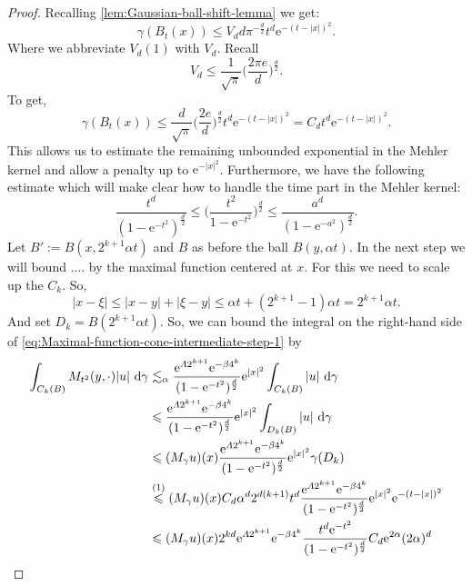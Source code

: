 \documentclass[a4paper,oneside,10pt]{amsproc}
\theoremstyle{remark}
\newcommand{\D}{\,\textup{d}}
\renewcommand{\leq}{\leqslant}
\renewcommand{\leq}{\leqslant}
\newcommand{\e}{\mathrm{e}} %
\renewcommand{\leq}{\leqslant}%
\begin{document}
\begin{proof}
  Recalling \autoref{lem:Gaussian-ball-shift-lemma} we get:
  \begin{equation}
    \label{eq:Gaussian-ball-Maximal-function-cone-proof-1}
    \gamma(B_t(x)) \leq V_d d \pi^{-\frac{d}2} t^d \e^{-(t - |x|)^2} .
  \end{equation}
  Where we abbreviate $V_d(1)$ with $V_d$.
  Recall
  \begin{equation*}
    V_d \leq \frac1{\sqrt{\pi}} \biggl(\frac{2\pi e}{d}
    \biggr)^{\frac{d}{2}}.
  \end{equation*}
  To get,
  \begin{equation}
    \label{eq:Gaussian-ball-Maximal-function-cone-proof-2}
    \gamma(B_t(x)) \leq \frac{d}{\sqrt{\pi}} \biggl(\frac{2 e}{d}
    \biggr)^{\frac{d}{2}} t^d \e^{-(t - |x|)^2} = C_d t^d \e^{-(t - |x|)^2}.
  \end{equation}
  This allows us to estimate the remaining unbounded exponential in the
  Mehler kernel and allow a penalty up to $\e^{-|x|^2}$. Furthermore,
  we have the following estimate which will make clear how to handle the
  time part in the Mehler kernel:
  \begin{equation*}
    \frac{t^d}{(1 - \e^{-t^2})^{\frac{d}2}} \leq \biggl(\frac{t^2}{1 -
      \e^{-t^2}} \biggr)^{\frac{d}2} \leq \frac{a^d}{(1 -
      \e^{-a^2})^{\frac{d}2}}.
  \end{equation*}
  Let $B' := B(x, 2^{k + 1} \alpha t)$ and $B$ as before the ball $B(y,
  \alpha t)$. In the next step we will bound ....
  by the maximal function centered at $x$. For this we need to scale
  up the $C_k$. So,
  \begin{equation*}
    |x - \xi| \leq |x - y| + |\xi - y| \leq \alpha t + (2^{k + 1} - 1)
    \alpha t = 2^{k + 1} \alpha t.
  \end{equation*}
  And set $D_k = B(2^{k + 1} \alpha t)$.
  So, we can bound the integral on the right-hand side of
  \eqref{eq:Maximal-function-cone-intermediate-step-1} by
  \begin{align*}
    \int_{C_k(B)}  M_{t^2}(y, \cdot) |u| \,\D\gamma & \lesssim_\alpha
    \frac{\e^{\Lambda 2^{k + 1}} \e^{-\beta 4^k}}{(1 -
      \e^{-t^2})^{\frac{d}2}}  \e^{|x|^2} \int_{C_k(B)} |u| \,\D\gamma\\
    &\leq \frac{\e^{\Lambda 2^{k + 1}} \e^{-\beta 4^k}}{(1 -
      \e^{-t^2})^{\frac{d}2}}  \e^{|x|^2} \int_{D_k(B)} |u| \,\D\gamma\\ 
    &\leq (M_\gamma u)(x) \frac{\e^{\Lambda 2^{k + 1}} \e^{-\beta
        4^k}}{(1 -  \e^{-t^2})^{\frac{d}2}}  \e^{|x|^2} \gamma(D_k)\\
    &\overset{(1)}{\leq} (M_\gamma u)(x) C_d \alpha^d 2^{d(k + 1)} t^d
    \frac{\e^{\Lambda 2^{k + 1}} \e^{-\beta 4^k}}{(1 -
      \e^{-t^2})^{\frac{d}2}}  \e^{|x|^2} \e^{-(t - |x|)^2}\\
    &\leq(M_\gamma u)(x)  2^{k d} \e^{\Lambda 2^{k + 1}} \e^{-\beta 4^k}
    \frac{t^d \e^{-t^2}}{(1 - \e^{-t^2})^{\frac{d}2}}  C_d \e^{2\alpha} (2\alpha)^d
  \end{align*}




\end{proof}
\end{document}
